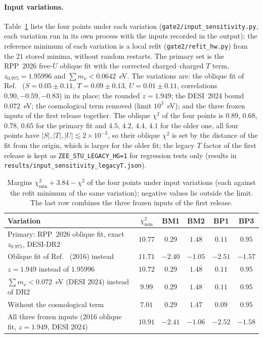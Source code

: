 \documentclass[twocolumn,epjc3]{svjour3}
\begin{document}
\paragraph{Input variations.} Table~\ref{tab:inp} lists the four points under each variation (\texttt{gate2/input\_sensitivity.py}, each variation run in its own process with the inputs recorded in the output); the reference minimum of each variation is a local refit (\texttt{gate2/refit\_hw.py}) from the $21$ stored minima, without random restarts. The primary set is the RPP~2026 free-$U$ oblique fit with the corrected charged--charged $T$ term, $z_{0.975}=1.95996$ and $\sum m_\nu<0.0642$~eV. The variations are: the oblique fit of Ref.~\cite{HerreroGarcia:2017xdq} ($S=0.05\pm0.11$, $T=0.09\pm0.13$, $U=0.01\pm0.11$, correlations $0.90,-0.59,-0.83$) in its place; the rounded $z=1.949$; the DESI~2024 bound $0.072$~eV; the cosmological term removed (limit $10^3$~eV); and the three frozen inputs of the first release together. The oblique $\chi^2$ of the four points is $0.89$, $0.68$, $0.78$, $0.65$ for the primary fit and $4.5$, $4.2$, $4.4$, $4.1$ for the older one, all four points have $|S|,|T|,|U|\lesssim2\times10^{-3}$, so their oblique $\chi^2$ is set by the distance of the fit from the origin, which is larger for the older fit; the legacy $T$ factor of the first release is kept as \texttt{ZEE\_STU\_LEGACY\_HG=1} for regression tests only (results in \texttt{results/input\_sensitivity\_legacyT.json}).
\begin{table}[t]
\centering
\caption{Margins $\chi^2_{\min}+3.84-\chi^2$ of the four points under input variations (each against the refit minimum of the same variation); negative values lie outside the limit. The last row combines the three frozen inputs of the first release.}\label{tab:inp}
\begin{tabular}{lccccc}
\hline
Variation & $\chi^2_{\min}$ & BM1 & BM2 & BP1 & BP3\\
\hline
Primary: RPP~2026 oblique fit, exact $z_{0.975}$, DESI-DR2 & $10.77$ & $0.29$ & $1.48$ & $0.11$ & $0.95$\\
Oblique fit of Ref.~\cite{HerreroGarcia:2017xdq} (2016) instead & $11.71$ & $-2.40$ & $-1.05$ & $-2.51$ & $-1.57$\\
$z=1.949$ instead of $1.95996$ & $10.72$ & $0.29$ & $1.48$ & $0.11$ & $0.95$\\
$\sum m_\nu<0.072$~eV (DESI 2024) instead of DR2 & $9.99$ & $0.29$ & $1.48$ & $0.11$ & $0.95$\\
Without the cosmological term & $7.01$ & $0.29$ & $1.47$ & $0.09$ & $0.95$\\
All three frozen inputs (2016 oblique fit, $z=1.949$, DESI 2024) & $10.91$ & $-2.41$ & $-1.06$ & $-2.52$ & $-1.58$\\
\hline
\end{tabular}
\end{table}
\end{document}

